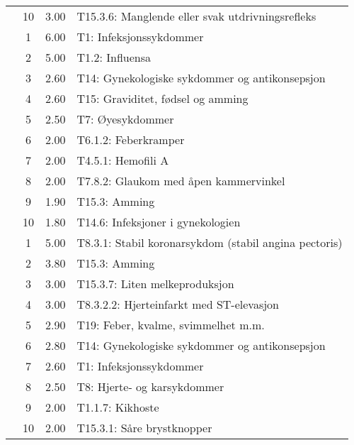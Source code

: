 \begin{table}[htbp]
\begin{tabular}{c c c l}
     & 10 & 3.00 & T15.3.6: Manglende eller svak utdrivningsrefleks \\
	\addlinespace
    3 & 1 & 6.00 & T1: Infeksjonssykdommer \\
     & 2 & 5.00 & T1.2: Influensa \\
     & 3 & 2.60 & T14: Gynekologiske sykdommer og antikonsepsjon \\
     & 4 & 2.60 & T15: Graviditet, fødsel og amming \\
     & 5 & 2.50 & T7: Øyesykdommer \\
     & 6 & 2.00 & T6.1.2: Feberkramper \\
     & 7 & 2.00 & T4.5.1: Hemofili A \\%
     & 8 & 2.00 & T7.8.2: Glaukom med åpen kammervinkel \\
     & 9 & 1.90 & T15.3: Amming \\
     & 10 & 1.80 & T14.6: Infeksjoner i gynekologien \\
	\addlinespace
    4 & 1 & 5.00 & T8.3.1: Stabil koronarsykdom (stabil angina pectoris) \\
     & 2 & 3.80 & T15.3: Amming \\
     & 3 & 3.00 & T15.3.7: Liten melkeproduksjon \\
     & 4 & 3.00 & T8.3.2.2: Hjerteinfarkt med ST-elevasjon \\
     & 5 & 2.90 & T19: Feber, kvalme, svimmelhet m.m. \\
     & 6 & 2.80 & T14: Gynekologiske sykdommer og antikonsepsjon \\
     & 7 & 2.60 & T1: Infeksjonssykdommer \\
     & 8 & 2.50 & T8: Hjerte- og karsykdommer \\
     & 9 & 2.00 & T1.1.7: Kikhoste \\
     & 10 & 2.00 & T15.3.1: Såre brystknopper \\
	\bottomrule
\end{tabular}
\end{table}

